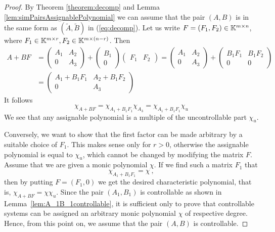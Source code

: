 \begin{proof}
    By Theorem \ref{theorem:decomp} and Lemma \ref{lem:simPairsAssignablePolynomial} we can assume that the pair $(A,B)$ is in the same form as $(\widetilde{A},\widetilde{B})$ in (\ref{eq:decomp}). Let us write $F=(F_1,F_2)\in\mathbb{K}^{m\times n}$, where $F_1\in\mathbb{K}^{m\times r}, F_2\in\mathbb{K}^{m\times (n-r)}$. Then 
    \begin{align*}
        A+BF&=
        \begin{pmatrix}
            A_1 & A_2 \\
            0   & A_3
        \end{pmatrix}
        +
        \begin{pmatrix}
            B_1 \\
            0
        \end{pmatrix}
        \begin{pmatrix}
            F_1 & F_2
        \end{pmatrix}
        =
        \begin{pmatrix}
            A_1 & A_2 \\
            0   & A_3
        \end{pmatrix}
        +
        \begin{pmatrix}
            B_1F_1 & B_1F_2 \\
            0 & 0
        \end{pmatrix}
        \\
        &=
        \begin{pmatrix}
            A_1+B_1F_1 & A_2+B_1F_2 \\
            0 & A_3
        \end{pmatrix}
    \end{align*}
    It follows 
    $$\chi_{A+BF}=\chi_{A_1+B_1F_1}\chi_{A_3}=\chi_{A_1+B_1F_1}\chi_u$$
    We see that any assignable polynomial is a multiple of the uncontrollable part $\chi_u$.

    Conversely, we want to show that the first factor can be made arbitrary by a suitable choice of $F_1$. This makes sense only for $r>0$, otherwise the assignable polynomial is equal to $\chi_u$, which cannot be changed by modifying the matrix $F$. Assume that we are given a monic polynomial $\chi$. If we find such a matrix $F_1$ that 
    $$\chi_{A_1+B_1F_1}=\chi\ ,$$
    then by putting $F=(F_1,0)$ we get the desired characteristic polynomial, that is, $\chi_{A+BF}=\chi\chi_u$. Since the pair $(A_1,B_1)$ is controllable as shown in Lemma~\ref{lem:A_1B_1controllable}, it is sufficient only to prove that controllable systems can be assigned an arbitrary monic polynomial $\chi$ of respective degree. Hence, from this point on, we assume that the pair $(A,B)$ is controllable.


\end{proof}
